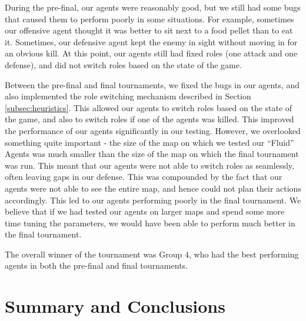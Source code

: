 \documentclass[a4paper,12pt]{article}
\begin{document}
During the pre-final, our agents were reasonably good, but we still had some bugs that caused them to perform poorly in some situations. For example, sometimes our offensive agent thought it was better to sit next to a food pellet than to eat it. Sometimes, our defensive agent kept the enemy in sight without moving in for an obvious kill. At this point, our agents still had fixed roles (one attack and one defense), and did not switch roles based on the state of the game.

Between the pre-final and final tournaments, we fixed the bugs in our agents, and also implemented the role switching mechanism described in Section \ref{subsec:heuristics}. This allowed our agents to switch roles based on the state of the game, and also to switch roles if one of the agents was killed. This improved the performance of our agents significantly in our testing. However, we overlooked something quite important - the size of the map on which we tested our ``Fluid'' Agents was much smaller than the size of the map on which the final tournament was run. This meant that our agents were not able to switch roles as seamlessly, often leaving gaps in our defense. This was compounded by the fact that our agents were not able to see the entire map, and hence could not plan their actions accordingly. This led to our agents performing poorly in the final tournament. We believe that if we had tested our agents on larger maps and spend some more time tuning the parameters, we would have been able to perform much better in the final tournament.

The overall winner of the tournament was Group 4, who had the best performing agents in both the pre-final and final tournaments.







\section{Summary and Conclusions}
\label{sec:conclusion}



\end{document}
